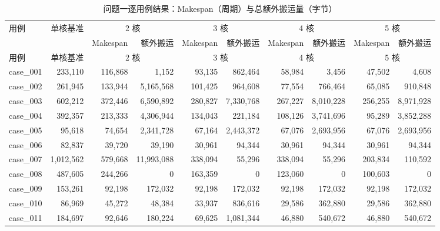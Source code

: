 \begin{footnotesize}
\setlength{\tabcolsep}{2.6pt}
\begin{longtable}{l r rr rr rr rr}
\caption{问题一逐用例结果：Makespan（周期）与总额外搬运量（字节）}\label{tab:app-p1}\\
\toprule
\multirow{2}{*}{用例} & \multirow{2}{*}{单核基准} & \multicolumn{2}{c}{2 核} & \multicolumn{2}{c}{3 核} & \multicolumn{2}{c}{4 核} & \multicolumn{2}{c}{5 核} \\
\cmidrule(lr){3-4}\cmidrule(lr){5-6}\cmidrule(lr){7-8}\cmidrule(lr){9-10}
 & & Makespan & 额外搬运 & Makespan & 额外搬运 & Makespan & 额外搬运 & Makespan & 额外搬运 \\
\midrule
\endfirsthead
\toprule
用例 & 单核基准 & \multicolumn{2}{c}{2 核} & \multicolumn{2}{c}{3 核} & \multicolumn{2}{c}{4 核} & \multicolumn{2}{c}{5 核} \\
\midrule
\endhead
\bottomrule
\endfoot
case\_001 & 233{,}110 & 116{,}868 & 1{,}152 & 93{,}135 & 862{,}464 & 58{,}984 & 3{,}456 & 47{,}502 & 4{,}608 \\
case\_002 & 261{,}945 & 133{,}944 & 5{,}165{,}568 & 101{,}425 & 964{,}608 & 77{,}554 & 766{,}464 & 65{,}085 & 910{,}848 \\
case\_003 & 602{,}212 & 372{,}446 & 6{,}590{,}892 & 280{,}827 & 7{,}330{,}768 & 267{,}227 & 8{,}010{,}228 & 256{,}255 & 8{,}971{,}928 \\
case\_004 & 392{,}357 & 213{,}333 & 4{,}306{,}944 & 134{,}043 & 221{,}184 & 108{,}126 & 3{,}741{,}696 & 95{,}289 & 3{,}852{,}288 \\
case\_005 & 95{,}618 & 74{,}654 & 2{,}341{,}728 & 67{,}164 & 2{,}443{,}372 & 67{,}076 & 2{,}693{,}956 & 67{,}076 & 2{,}693{,}956 \\
case\_006 & 82{,}837 & 39{,}720 & 39{,}190 & 30{,}961 & 94{,}344 & 30{,}961 & 94{,}344 & 30{,}961 & 94{,}344 \\
case\_007 & 1{,}012{,}562 & 579{,}668 & 11{,}993{,}088 & 338{,}094 & 55{,}296 & 338{,}094 & 55{,}296 & 203{,}834 & 110{,}592 \\
case\_008 & 487{,}605 & 244{,}266 & 0 & 163{,}359 & 0 & 123{,}060 & 0 & 100{,}603 & 0 \\
case\_009 & 153{,}261 & 92{,}198 & 172{,}032 & 92{,}198 & 172{,}032 & 92{,}198 & 172{,}032 & 92{,}198 & 172{,}032 \\
case\_010 & 86{,}969 & 45{,}272 & 48{,}384 & 33{,}937 & 836{,}616 & 29{,}586 & 362{,}880 & 29{,}586 & 362{,}880 \\
case\_011 & 184{,}697 & 92{,}646 & 180{,}224 & 69{,}625 & 1{,}081{,}344 & 46{,}880 & 540{,}672 & 46{,}880 & 540{,}672 \\

\end{longtable}
\end{footnotesize}
